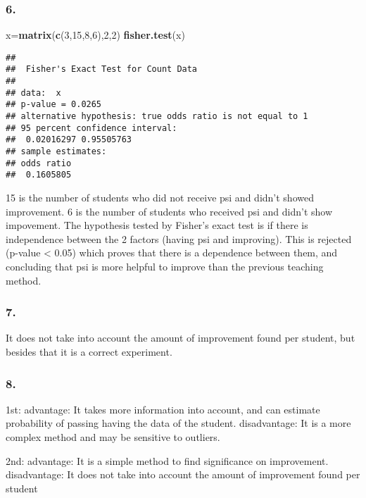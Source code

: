 \documentclass[11pt,]{article}
\newenvironment{Shaded}{\begin{snugshade}}{\end{snugshade}}
\newcommand{\KeywordTok}[1]{\textcolor[rgb]{0.13,0.29,0.53}{\textbf{{#1}}}}
\newcommand{\DecValTok}[1]{\textcolor[rgb]{0.00,0.00,0.81}{{#1}}}
\newcommand{\NormalTok}[1]{{#1}}
\begin{document}
\subsubsection{6.}\label{section-12}

\begin{Shaded}
\begin{Highlighting}[]
\NormalTok{x=}\KeywordTok{matrix}\NormalTok{(}\KeywordTok{c}\NormalTok{(}\DecValTok{3}\NormalTok{,}\DecValTok{15}\NormalTok{,}\DecValTok{8}\NormalTok{,}\DecValTok{6}\NormalTok{),}\DecValTok{2}\NormalTok{,}\DecValTok{2}\NormalTok{)}
\KeywordTok{fisher.test}\NormalTok{(x)}
\end{Highlighting}
\end{Shaded}

\begin{verbatim}
## 
##  Fisher's Exact Test for Count Data
## 
## data:  x
## p-value = 0.0265
## alternative hypothesis: true odds ratio is not equal to 1
## 95 percent confidence interval:
##  0.02016297 0.95505763
## sample estimates:
## odds ratio 
##  0.1605805
\end{verbatim}

15 is the number of students who did not receive psi and didn't showed
improvement. 6 is the number of students who received psi and didn't
show impovement. The hypothesis tested by Fisher's exact test is if
there is independence between the 2 factors (having psi and improving).
This is rejected (p-value \textless{} 0.05) which proves that there is a
dependence between them, and concluding that psi is more helpful to
improve than the previous teaching method.

\subsubsection{7.}\label{section-13}

It does not take into account the amount of improvement found per
student, but besides that it is a correct experiment.

\subsubsection{8.}\label{section-14}

1st: advantage: It takes more information into account, and can estimate
probability of passing having the data of the student. disadvantage: It
is a more complex method and may be sensitive to outliers.

2nd: advantage: It is a simple method to find significance on
improvement. disadvantage: It does not take into account the amount of
improvement found per student
\end{document}
